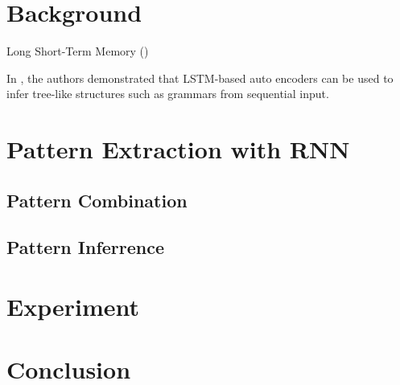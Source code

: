 \documentclass{article}
\begin{document}
\section{Background}\label{sec:background}
Long Short-Term Memory (\cite{lstm_1997})
 
In \cite{grammar_2014}, the authors demonstrated that LSTM-based auto encoders can be used to infer tree-like structures such as grammars from sequential input.
\section{Pattern Extraction with RNN}\label{sec:pernn}
\subsection{Pattern Combination}\label{sec:combo}

\subsection{Pattern Inferrence}\label{sec:pattern}

\section{Experiment}\label{sec:experiment}

\section{Conclusion}\label{sec:conclusion}



\end{document}

